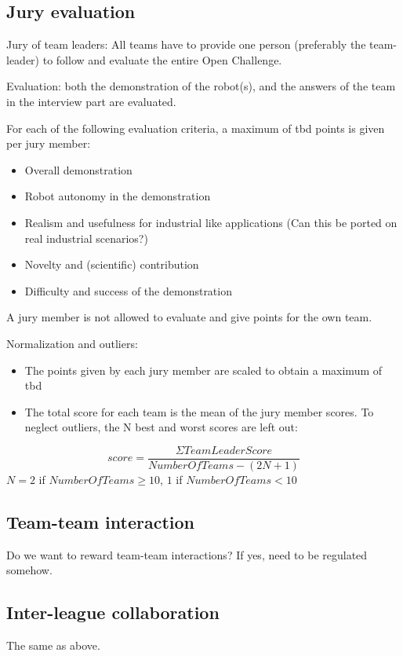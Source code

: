 \subsection{Jury​ ​evaluation}
Jury​ ​of​ ​team​ ​leaders:​ All teams have to provide one person (preferably the team-leader) to follow and evaluate the entire Open Challenge. \par
Evaluation:​ both the demonstration of the robot(s), and the answers of the team in the interview part are evaluated. \par
For each of the following evaluation criteria, a maximum of tbd points is given per jury member:
\begin{itemize}
\item Overall demonstration
\item Robot autonomy in the demonstration

\item Realism and usefulness for industrial like applications (Can this be ported on real industrial scenarios?)
\item Novelty and (scientific) contribution
\item Difficulty and success of the demonstration
\end{itemize}
A jury member is not allowed to evaluate and give points for the own team. \par 
Normalization​ ​and​ ​outliers:
\begin{itemize}
\item The points given by each jury member are scaled to obtain a maximum of tbd
\item The total score for each team is the mean of the jury member scores. To neglect outliers, the N best and worst scores are left out:
\end{itemize}

\begin{equation}
score=\frac{\Sigma TeamLeaderScore}{NumberOfTeams−(2N+1)}
\end{equation} 
$N = 2$ if $NumberOfTeams \geq 10$, $1$ if $NumberOfTeams < 10$


\subsection{Team-team​ ​interaction}
Do we want to reward team-team interactions? If yes, need to be regulated somehow.

\subsection{Inter-league​ ​collaboration}
The same as above.
